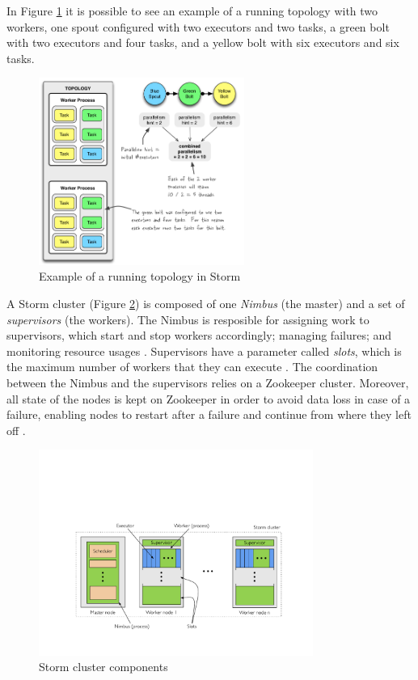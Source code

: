 \documentclass[ppgc,diss,english]{iiufrgs}
\begin{document}
In Figure \ref{fig:storm_running_topology} it is possible to see an example of a running topology with two workers, one spout configured with two executors and two tasks, a green bolt with two executors and four tasks, and a yellow bolt with six executors and six tasks.

\begin{figure}[!ht]
	\centering
	\includegraphics[width=0.6\textwidth]{images/storm/example-of-a-running-topology.png}
	\caption[Example of a running topology in Storm]{Example of a running topology in Storm \cite{storm2015docs}}
	\label{fig:storm_running_topology}
\end{figure}

A Storm cluster (Figure \ref{fig:storm_cluster}) is composed of one \emph{Nimbus} (the master) and a set of \emph{supervisors} (the workers). The Nimbus is resposible for assigning work to supervisors, which start and stop workers accordingly; managing failures; and monitoring resource usages \cite{heinze2014cloud}. Supervisors have a parameter called \emph{slots}, which is the maximum number of workers that they can execute \cite{aniello2013adaptive}. The coordination between the Nimbus and the supervisors relies on a Zookeeper cluster. Moreover, all state of the nodes is kept on Zookeeper in order to avoid data loss in case of a failure, enabling nodes to restart after a failure and continue from where they left off \cite{storm2015docs}.

\begin{figure}[!ht]
	\centering
	\includegraphics[width=0.8\textwidth]{images/storm/cluster.pdf}
	\caption[Storm cluster components]{Storm cluster components \cite{heinze2014cloud}}
	\label{fig:storm_cluster}
\end{figure}
\end{document}
